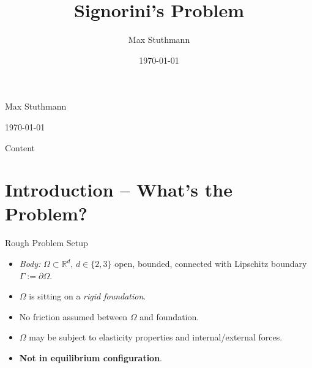 \documentclass[10pt,aspectratio=169]{beamer}
\title{Signorini's Problem}
\author{Max Stuthmann}
\date{\today}
\def\R{{\mathbb R}}
\begin{document}
\begin{frame}
	\centering
	\vspace*{0.7cm}

	\setlength{\fboxsep}{0pt}
	\par
	\vspace{0.4cm}
	{\large Max Stuthmann\par}
	\vspace{0.2cm}
	{\normalsize \today\par}
	\vfill
	\scalebox{0.95}{}
	\vspace{0.4cm}
\end{frame}

\begin{frame}{Content}
	\tableofcontents
\end{frame}

\section{Introduction -- What's the Problem?}
\begin{frame}{Rough Problem Setup}
	\begin{itemize}
		\item {\em Body: } $\Omega\subset\R^d,\, d\in\{2,3\}$ open, bounded, connected with Lipschitz boundary $\Gamma:= \partial\Omega$.
		\item $\Omega$ is sitting on a {\em rigid foundation}.
		\item No friction assumed between $\Omega$ and foundation.
		\item $\Omega$ may be subject to elasticity properties and internal/external forces.
		\item {\bf Not in equilibrium configuration}.
	\end{itemize}
	\begin{figure}[!h]
		\centering
		
	\end{figure}
\end{frame}
\end{document}
